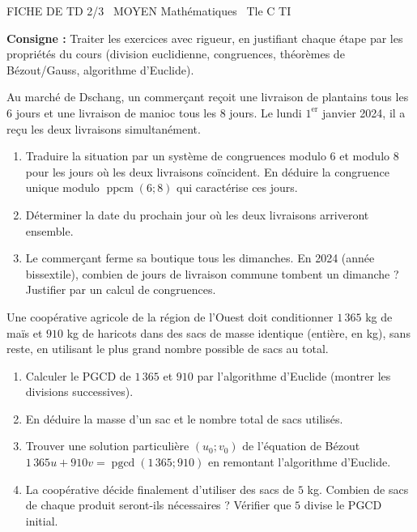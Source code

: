 \documentclass[11pt]{article}
\begin{document}
\begin{tcolorbox}[enhanced,colback=popink,colframe=popink,arc=10pt,boxrule=0pt,left=12pt,right=12pt,top=9pt,bottom=9pt]
{\color{white}\popxbold\small FICHE DE TD 2/3 \textbullet\ MOYEN \hfill Mathématiques \textbullet\ Tle C TI\par}
\end{tcolorbox}
\vspace{4pt}
\noindent \textbf{Consigne :} Traiter les exercices avec rigueur, en justifiant chaque étape par les propriétés du cours (division euclidienne, congruences, théorèmes de Bézout/Gauss, algorithme d'Euclide).

\begin{exercice}
Au marché de Dschang, un commerçant reçoit une livraison de plantains tous les $6$ jours et une livraison de manioc tous les $8$ jours. Le lundi $1^{\text{er}}$ janvier 2024, il a reçu les deux livraisons simultanément.
\begin{enumerate}
    \item Traduire la situation par un système de congruences modulo $6$ et modulo $8$ pour les jours où les deux livraisons coïncident. En déduire la congruence unique modulo $\operatorname{ppcm}(6;8)$ qui caractérise ces jours.
    \item Déterminer la date du prochain jour où les deux livraisons arriveront ensemble.
    \item Le commerçant ferme sa boutique tous les dimanches. En 2024 (année bissextile), combien de jours de livraison commune tombent un dimanche ? Justifier par un calcul de congruences.
\end{enumerate}
\end{exercice}

\begin{exercice}
Une coopérative agricole de la région de l'Ouest doit conditionner $1\,365$ kg de maïs et $910$ kg de haricots dans des sacs de masse identique (entière, en kg), sans reste, en utilisant le plus grand nombre possible de sacs au total.
\begin{enumerate}
    \item Calculer le PGCD de $1\,365$ et $910$ par l'algorithme d'Euclide (montrer les divisions successives).
    \item En déduire la masse d'un sac et le nombre total de sacs utilisés.
    \item Trouver une solution particulière $(u_0; v_0)$ de l'équation de Bézout $1\,365 u + 910 v = \operatorname{pgcd}(1\,365; 910)$ en remontant l'algorithme d'Euclide.
    \item La coopérative décide finalement d'utiliser des sacs de $5$ kg. Combien de sacs de chaque produit seront-ils nécessaires ? Vérifier que $5$ divise le PGCD initial.
\end{enumerate}
\end{exercice}
\end{document}
